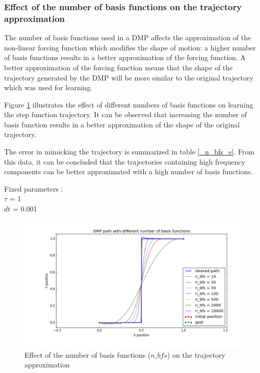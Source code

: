 \subsubsection{Effect of the number of basis functions on the trajectory approximation}

The number of basis functions used in a DMP affects the approximation of the non-linear forcing function which modifies the shape of motion: a higher number of basis functions results in a better approximation of the forcing function. A better approximation of the forcing function means that the shape of the trajectory generated by the DMP will be more similar to the original trajectory which was used for learning. 

Figure \ref{fig:n_bfs_} illustrates the effect of different numbers of basis functions on 
learning the step function trajectory. It can be observed that increasing the number of basis function results in a better approximation of the shape of the original trajectory.  

The error in mimicking the trajectory is summarized in table \ref{_n_bfs_e}. From this data, it can be concluded that the trajectories containing high frequency components can be better approximated with a high number of basis functions.

Fixed parameters : \\
$\tau$ = 1 \\
$dt$ = 0.001

\begin{figure}[H]
	\includegraphics[width=\textwidth]{images/n_bfs_.png}
	\caption{Effect of the number of basis functions ($n\_bfs$) on the trajectory approximation}
	\label{fig:n_bfs_}
\end{figure}



